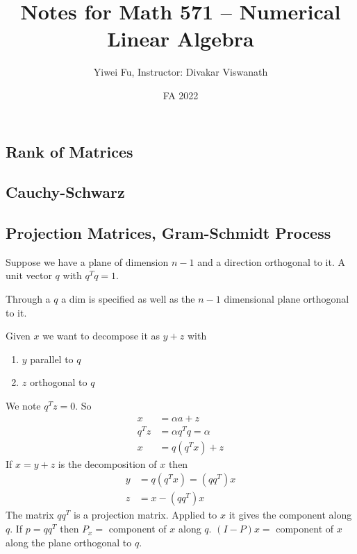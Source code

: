\documentclass{report}
\theoremstyle{definition}
\theoremstyle{remark}
\numberwithin{equation}{section}
\begin{document}
\title{Notes for Math 571 -- Numerical Linear Algebra}
\author{Yiwei Fu, Instructor: Divakar Viswanath}
\date{FA 2022}
\maketitle


\tableofcontents


\clearpage
{}

\chapter{}

\section{Rank of Matrices}

\section{Cauchy-Schwarz}

\section{Projection Matrices, Gram-Schmidt Process}
Suppose we have a plane of dimension $n-1$ and a direction orthogonal to it. A unit vector $q$ with $q^Tq = 1$.

Through a $q$ a dim is specified as well as the $n-1$ dimensional plane orthogonal to it.

Given $x$ we want to decompose it as $y + z$ with \begin{enumerate}
    \item $y$ parallel to $q$
    \item $z$ orthogonal to $q$
\end{enumerate}

We note $q^Tz = 0$. So \begin{align*}
    x & = \alpha a + z \\
    q^Tz & = \alpha q^T q = \alpha \\
    x & = q (q^Tx) + z
\end{align*}
If $x = y+z$ is the decomposition of $x$ then \begin{align*}
    y & = q(q^Tx) = (qq^T)x \\
    z & = x - (qq^T)x
\end{align*}
The matrix $qq^T$ is a projection matrix. Applied to $x$ it gives the component along $q$. If $p = qq^T$ then $P_x = $ component of $x$ along $q$. $(I-P)x = $ component of $x$ along the plane orthogonal to $q$.
\end{document}
